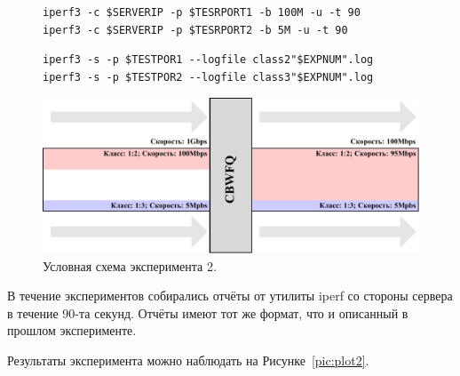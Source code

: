 	        \begin{figure}[ht!]
    		\center
    		\begin{lstlisting}[frame=lines,
    						  caption={Команда iperf на узле-источнике (клиентская сторона).},
    						  label={lst:iperfsrc2}]
iperf3 -c $SERVERIP -p $TESRPORT1 -b 100M -u -t 90
iperf3 -c $SERVERIP -p $TESRPORT2 -b 5M -u -t 90
    		\end{lstlisting}
        \end{figure}	
        \begin{figure}[ht!]
    		\center
    		\begin{lstlisting}[frame=lines,
    						  caption={Команда iperf на узле-цели (серверная сторона).},
    						  label={lst:iperfdst2}]
iperf3 -s -p $TESTPOR1 --logfile class2"$EXPNUM".log
iperf3 -s -p $TESTPOR2 --logfile class3"$EXPNUM".log
    		\end{lstlisting}
        \end{figure}

		\begin{figure}[ht!]
			\center
			\includegraphics[scale=0.9]{./pdfimages/exp_scheme2.pdf}
			\caption{Условная схема эксперимента 2.}
			\label{pic:exp2}
		\end{figure}

    		В течение экспериментов собирались отчёты от утилиты iperf со стороны сервера в
    		течение 90-та секунд. Отчёты имеют тот же формат, что и описанный в прошлом эксперименте.

			Результаты эксперимента можно наблюдать на Рисунке~\ref{pic:plot2}.



